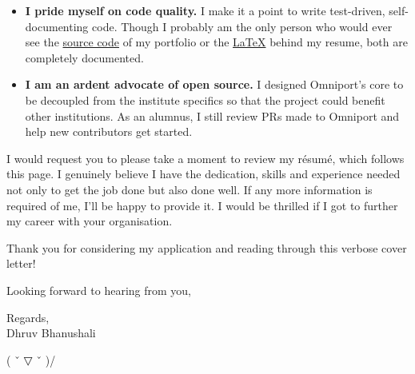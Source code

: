 \begin{itemize}[nosep, parsep = 1mm, leftmargin = *]
  \item \textbf{I pride myself on code quality.} I make it a point to write
  test-driven, self-documenting code. Though I probably am the only person who
  would ever see the \href{https://github.com/dhruvkb/portfolio/}{source code}
  of my portfolio or the
  \href{https://github.com/dhruvkb/resume/}{\selectfont\LaTeX}
  behind my resume, both are completely documented.

  \item \textbf{I am an ardent advocate of open source.} I designed Omniport's
  core to be decoupled from the institute specifics so that the project could
  benefit other institutions. As an alumnus, I still review PRs made to Omniport
  and help new contributors get started.
\end{itemize}

I would request you to please take a moment to review my résumé, which follows
this page. I genuinely believe I have the dedication, skills and experience
needed not only to get the job done but also done well. If any more information
is required of me, I'll be happy to provide it. I would be thrilled if I got to
further my career with your organisation.

Thank you for considering my application and reading through this verbose cover
letter!

Looking forward to hearing from you,

Regards,\\
Dhruv Bhanushali
\setlength{\parskip}{0cm} %

\vfill
\textcolor{secondary}{( ˇ ▽ ˇ )/}
\pagebreak